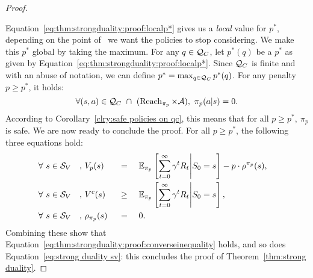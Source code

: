 \begin{proof}
\begin{subproof}
	\end{subproof}
	Equation~\eqref{eq:thm:strongduality:proof:localp*} gives us a \emph{local} value for $p^*$, depending on the point of \QC~we want the policies to stop considering. We make this $p^*$ global by taking the maximum. For any $q\in\mathcal{Q}_{C}$, let $p^*(q)$ be a $p^*$ as given by Equation~\eqref{eq:thm:strongduality:proof:localp*}. Since $\mathcal{Q}_{C}$ is finite and with an abuse of notation, we can define $p^* = \max_{q\in\mathcal{Q}_{C}}p^*(q)$. For any penalty $p \geq p^*$, it holds:
	\begin{equation}
	\forall (s,a)\in\mathcal{Q}_{C}~\cap~(\operatorname{Reach}_{\pi_p}\times\mathcal{A}),~\pi_p(a|s) = 0.
	\end{equation}
	According to Corollary~\ref{clry:safe policies on qc}, this means that for all $p \geq p^*,~\pi_p$ is safe. We are now ready to conclude the proof. For all $p \geq p^*$, the following three equations hold:
	\begin{alignat}{8}
	&\forall~s\in{\ensuremath{\mathcal{S}}_{V}}&,~&V_p(s)& &=&~ &\mathbb{E}_{\pi_p}\left[\sum_{t=0}^\infty\gamma^tR_t\middle|S_0=s\right] - p\cdot\rho^{\pi_p}(s),&\\
	&\forall~s\in{\ensuremath{\mathcal{S}}_{V}}&,~&V^c(s) & &\geq&~ &\mathbb{E}_{\pi_p}\left[\sum_{t=0}^\infty\gamma^tR_t\middle|S_0=s\right],&\\
	&\forall~s\in{\ensuremath{\mathcal{S}}_{V}}&,~&\rho_{\pi_p}(s)&~&=&~&0.&
	\end{alignat}
	Combining these show that Equation~\eqref{eq:thm:strongduality:proof:converseinequality} holds, and so does Equation~\eqref{eq:strong duality sv}: this concludes the proof of Theorem~\ref{thm:strong duality}.
\end{proof}